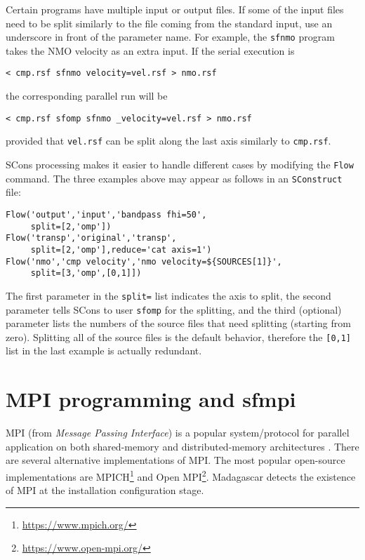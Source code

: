 Certain programs have multiple input or output files. If some of the
input files need to be split similarly to the file coming from the
standard input, use an underscore in front of the parameter name. For
example, the \texttt{sfnmo} program takes the NMO velocity as an extra
input. If the serial execution is
\begin{verbatim}
< cmp.rsf sfnmo velocity=vel.rsf > nmo.rsf
\end{verbatim}
the corresponding parallel run will be
\begin{verbatim}
< cmp.rsf sfomp sfnmo _velocity=vel.rsf > nmo.rsf
\end{verbatim}
provided that \texttt{vel.rsf} can be split along the last axis
similarly to \texttt{cmp.rsf}.

SCons processing makes it easier to handle different cases by
modifying the \texttt{Flow} command. The three examples above may
appear as follows in an \texttt{SConstruct} file:

\lstset{language=python,showstringspaces=false,frame=single}
\begin{lstlisting}
Flow('output','input','bandpass fhi=50',
     split=[2,'omp'])
Flow('transp','original','transp',
     split=[2,'omp'],reduce='cat axis=1')
Flow('nmo','cmp velocity','nmo velocity=${SOURCES[1]}',
     split=[3,'omp',[0,1]])
\end{lstlisting}

The first parameter in the \texttt{split=} list indicates the axis to
split, the second parameter tells SCons to user \texttt{sfomp} for the
splitting, and the third (optional) parameter lists the numbers of the
source files that need splitting (starting from zero). Splitting all
of the source files is the default behavior, therefore the
\texttt{[0,1]} list in the last example is actually redundant.

\section{MPI programming and sfmpi}

MPI (from \emph{Message Passing Interface}) is a popular
system/protocol for parallel application on both shared-memory and
distributed-memory architectures \cite[]{pacheco,gropp}. There are several alternative
implementations of MPI. The most popular open-source implementations
are MPICH\footnote{\url{https://www.mpich.org/}} and Open
MPI\footnote{\url{https://www.open-mpi.org/}}. Madagascar detects the
existence of MPI at the installation configuration stage. 


